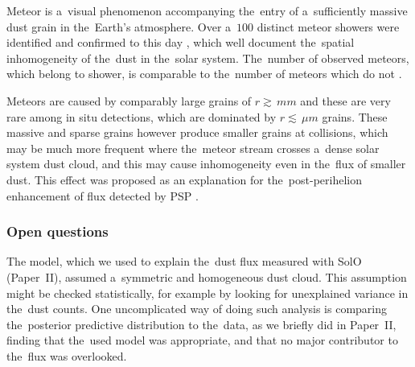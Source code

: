 Meteor is a~visual phenomenon accompanying the~entry of a~sufficiently massive dust grain in the~Earth's atmosphere. Over a~$100$ distinct meteor showers were identified and confirmed to this day \citep{jenniskens2020removing}, which well document the~spatial inhomogeneity of the~dust in the~solar system. The~number of observed meteors, which belong to shower, is comparable to the~number of meteors which do not \citep{jenniskens2016cams}. 

Meteors are caused by comparably large grains of $r \gtrsim \, \si{mm}$ and these are very rare among in situ detections, which are dominated by $r \lesssim \, \si{\mu m}$ grains. These massive and sparse grains however produce smaller grains at collisions, which may be much more frequent where the~meteor stream crosses a~dense solar system dust cloud, and this may cause inhomogeneity even in the~flux of smaller dust. This effect was proposed as an explanation for the~post-perihelion enhancement of flux detected by PSP \citep{szalay2021collisional}. 

\subsubsection{Open questions}

The model, which we used to explain the~dust flux measured with SolO (Paper~II), assumed a~symmetric and homogeneous dust cloud. This assumption might be checked statistically, for example by looking for unexplained variance in the~dust counts. One uncomplicated way of doing such analysis is comparing the~posterior predictive distribution to the~data, as we briefly did in Paper~II, finding that the~used model was appropriate, and that no major contributor to the~flux was overlooked. 






